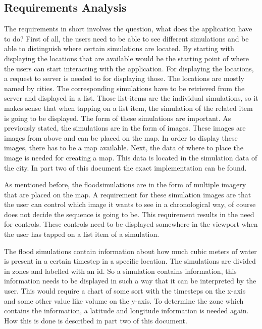 \subsection{Requirements Analysis}
\label{sec:requirements}
The requirements in short involves the question, what does the application have to do? First of all, the users need to be able to see different simulations and be able to distinguish where certain simulations are located. By starting with displaying the locations that are available would be the starting point of where the users can start interacting with the application. For displaying the locations, a request to server is needed to for displaying those. 
The locations are mostly named by cities. The corresponding simulations have to be retrieved from the server and displayed in a list. Those list-items are the individual simulations, so it makes sense that when tapping on a list item, the simulation of the related item is going to be displayed. The form of these simulations are important. As previously stated, the simulations are in the form of images. These images are images from above and can be placed on the map. In order to display these images, there has to be a map available. Next, the data of where to place the image is needed for creating a map. This data is located in the simulation data of the city. In part two of this document the exact implementation can be found.

As mentioned before, the floodsimulations are in the form of multiple imagery that are placed on the map. A requirement for these simulation images are that the user can control which image it wants to see in a chronological way, of course does not decide the sequence is going to be. This requirement results in the need for controls. These controls need to be displayed somewhere in the viewport when the user has tapped on a list item of a simulation.

The flood simulations contain information about how much cubic meters of water is present in a certain timestep in a specific location. The simulations are divided in zones and labelled with an id. So a simulation contains information, this information needs to be displayed in such a way that it can be interpreted by the user. This would require a chart of some sort with the timesteps on the x-axis and some other value like volume on the y-axis. To determine the zone which contains the information, a latitude and longitude information is needed again. How this is done is described in part two of this document.

